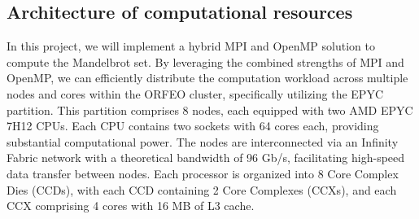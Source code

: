 \subsection{Architecture of computational resources}

In this project, we will implement a hybrid MPI and OpenMP solution to compute the Mandelbrot set. By leveraging the combined strengths of MPI and OpenMP, we can efficiently distribute the computation workload across multiple nodes and cores within the ORFEO cluster, specifically utilizing the EPYC partition. This partition comprises 8 nodes, each equipped with two AMD EPYC 7H12 CPUs. Each CPU contains two sockets with 64 cores each, providing substantial computational power. The nodes are interconnected via an Infinity Fabric network with a theoretical bandwidth of 96 Gb/s, facilitating high-speed data transfer between nodes. Each processor is organized into 8 Core Complex Dies (CCDs), with each CCD containing 2 Core Complexes (CCXs), and each CCX comprising 4 cores with 16 MB of L3 cache.
